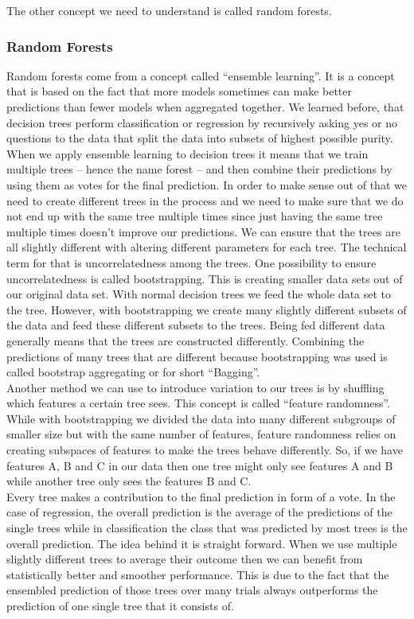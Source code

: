 \documentclass[a4paper,12pt]{report}
\begin{document}
	The other concept we need to understand is called random forests.
	
	\subsubsection{Random Forests}
	
	Random forests come from a concept called “ensemble learning”. It is a concept that is based on the fact that more models sometimes can make better predictions than fewer models when aggregated together. We learned before, that decision trees perform classification or regression by recursively asking yes or no questions to the data that split the data into subsets of highest possible purity.
When we apply ensemble learning to decision trees it means that we train multiple trees \cite{55} – hence the name forest – and then combine their predictions by using them as votes for the final prediction. In order to make sense out of that we need to create different trees in the process and we need to make sure that we do not end up with the same tree multiple times since just having the same tree multiple times doesn’t improve our predictions. We can ensure that the trees are all slightly different with altering different parameters for each tree. The technical term for that is uncorrelatedness among the trees. One possibility to ensure uncorrelatedness is called bootstrapping. This is creating smaller data sets out of our original data set. With normal decision trees we feed the whole data set to the tree. However, with bootstrapping we create many slightly different subsets of the data and feed these different subsets to the trees. Being fed different data generally means that the trees are constructed differently. Combining the predictions of many trees that are different because bootstrapping was used is called bootstrap aggregating or for short “Bagging”.\\
Another method we can use to introduce variation to our trees is by shuffling which features a certain tree sees. This concept is called “feature randomness”. While with bootstrapping we divided the data into many different subgroups of smaller size but with the same number of features, feature randomness relies on creating subspaces of features to make the trees behave differently. So, if we have features A, B and C in our data then one tree might only see features A and B while another tree only sees the features B and C.\\
Every tree makes a contribution to the final prediction in form of a vote. In the case of regression, the overall prediction is the average of the predictions of the single trees while in classification the class that was predicted by most trees is the overall prediction. The idea behind it is straight forward. When we use multiple slightly different trees to average their outcome then we can benefit from statistically better and smoother performance. This is due to the fact that the ensembled prediction of those trees over many trials always outperforms the prediction of one single tree that it consists of.
\end{document}

